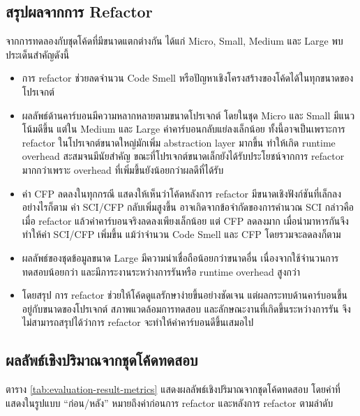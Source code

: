 \subsection{สรุปผลจากการ Refactor}

จากการทดลองกับชุดโค้ดที่มีขนาดแตกต่างกัน ได้แก่ Micro, Small, Medium และ Large พบประเด็นสำคัญดังนี้

\begin{itemize}
    \item การ refactor ช่วยลดจำนวน Code Smell หรือปัญหาเชิงโครงสร้างของโค้ดได้ในทุกขนาดของโปรเจกต์
    \item ผลลัพธ์ด้านคาร์บอนมีความหลากหลายตามขนาดโปรเจกต์ โดยในชุด Micro และ Small มีแนวโน้มดีขึ้น แต่ใน Medium และ Large ค่าคาร์บอนกลับแย่ลงเล็กน้อย ทั้งนี้อาจเป็นเพราะการ refactor ในโปรเจกต์ขนาดใหญ่มักเพิ่ม {\italicfont abstraction layer} มากขึ้น ทำให้เกิด {\italicfont runtime overhead} สะสมจนมีนัยสำคัญ ขณะที่โปรเจกต์ขนาดเล็กยังได้รับประโยชน์จากการ refactor มากกว่าเพราะ {\italicfont overhead} ที่เพิ่มขึ้นยังน้อยกว่าผลดีที่ได้รับ
    \item ค่า CFP ลดลงในทุกกรณี แสดงให้เห็นว่าโค้ดหลังการ refactor มีขนาดเชิงฟังก์ชันที่เล็กลง อย่างไรก็ตาม ค่า SCI/CFP กลับเพิ่มสูงขึ้น อาจเกิดจากข้อจำกัดของการคำนวณ SCI กล่าวคือเมื่อ refactor แล้วค่าคาร์บอนจริงลดลงเพียงเล็กน้อย แต่ CFP ลดลงมาก เมื่อนำมาหารกันจึงทำให้ค่า SCI/CFP เพิ่มขึ้น แม้ว่าจำนวน Code Smell และ CFP โดยรวมจะลดลงก็ตาม
    \item ผลลัพธ์ของชุดข้อมูลขนาด Large มีความน่าเชื่อถือน้อยกว่าขนาดอื่น เนื่องจากใช้จำนวนการทดสอบน้อยกว่า และมีภาระงานระหว่างการรันหรือ runtime overhead สูงกว่า
    \item โดยสรุป การ refactor ช่วยให้โค้ดดูแลรักษาง่ายขึ้นอย่างชัดเจน แต่ผลกระทบด้านคาร์บอนขึ้นอยู่กับขนาดของโปรเจกต์ สภาพแวดล้อมการทดสอบ และลักษณะงานที่เกิดขึ้นระหว่างการรัน จึงไม่สามารถสรุปได้ว่าการ refactor จะทำให้ค่าคาร์บอนดีขึ้นเสมอไป
\end{itemize}

\subsection{ผลลัพธ์เชิงปริมาณจากชุดโค้ดทดสอบ}

ตาราง \ref{tab:evaluation-result-metrics} แสดงผลลัพธ์เชิงปริมาณจากชุดโค้ดทดสอบ โดยค่าที่แสดงในรูปแบบ ``ก่อน/หลัง'' หมายถึงค่าก่อนการ refactor และหลังการ refactor ตามลำดับ

